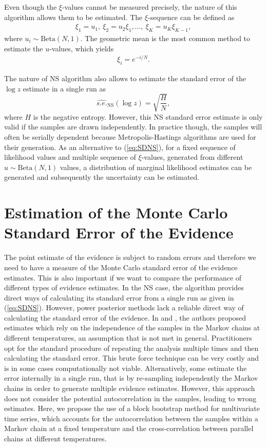 \documentclass[aps,reprint,amsmath,amssymb,showpacs,showkeys]{revtex4-1}%
\begin{document}
Even though the $\xi$-values cannot be measured precisely, the nature of this algorithm allows them to be estimated. 
The $\xi$-sequence can be defined as 
\begin{align*}
\xi_1 = u_1,\: \xi_2 = u_2 \xi_1, \dots,\: \xi_K = u_K \xi_{K-1},
\end{align*}
where $u_i\sim\text{Beta}(N,1)$.  The geometric mean is the most common method to estimate the $u$-values, which yields
\begin{align*}
\xi_i = e^{-i/N}.
\end{align*}

The nature of NS algorithm also allows to estimate the standard error of the $\log z$ estimate in a single run as 
\begin{equation}\label{eq:SDNS}
\widehat{s.e.}_{\text{NS}}(\log z) = \sqrt{\dfrac{H}{N}},
\end{equation}
where $H$ is the negative entropy.  However, this NS standard error estimate is only valid if the samples are drawn independently. In practice though, the samples will often be serially dependent because Metropolis-Hastings algorithms are  used for their generation. As an alternative to (\ref{eq:SDNS}), for a fixed sequence of likelihood values and multiple sequence of $\xi$-values, generated from different  $u\!\sim\!\text{Beta}(N,1)$ values, a distribution of marginal likelihood estimates can be generated and subsequently the uncertainty can be estimated. 
\bigskip


\section{Estimation of the Monte Carlo Standard Error of the Evidence}
The point estimate of the evidence is subject to random errors and therefore we need 
 to have a measure of the Monte Carlo standard error of the evidence estimates.  This is also important if we want to compare the  performance of different types of evidence estimates.  In the NS case, the algorithm provides direct ways of calculating its standard error from  a single run as given in (\ref{eq:SDNS}).  However, power posterior methods lack a reliable direct way of calculating the standard error of the evidence.  In \cite{Lartillot:Philippe:2006} and \cite{Xie:Lewis:Fan:Kuo:Chen:2011}, the authors proposed estimates which rely on the  independence of the samples in the Markov chains at different temperatures, an assumption that is not met  in general.  Practitioners opt for the standard procedure of repeating the analysis multiple times and then calculating the standard error.  This brute force technique can be very costly and is in some cases computationally not viable.  Alternatively, some estimate the error internally in a single run, that is by re-sampling independently the Markov chains in order to generate multiple evidence estimates.  However, this approach does not consider the potential autocorrelation in the samples, leading to wrong estimates.  Here, we propose the use of a block bootstrap method for multivariate time series, which accounts for  the autocorrelation between the samples within a Markov chain at a fixed
temperature and the cross-correlation between parallel chains at different temperatures.
	
\end{document}
